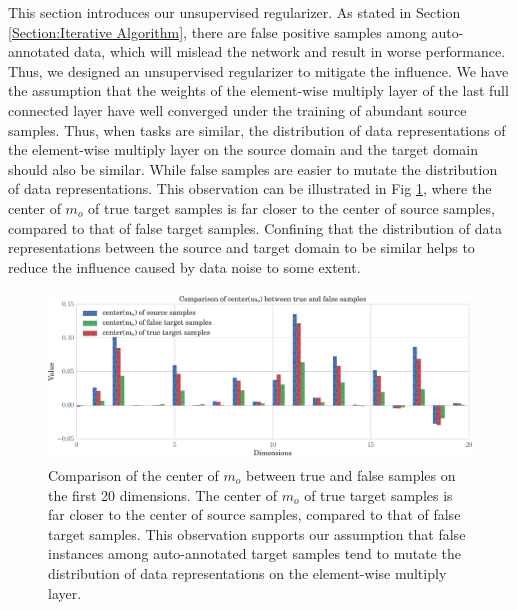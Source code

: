 \documentclass[runningheads]{llncs}
\begin{document}
This section introduces our unsupervised regularizer. As stated in Section \ref{Section:Iterative Algorithm}, there are false positive samples among auto-annotated data, which will mislead the network and result in worse performance. Thus, we designed an unsupervised regularizer to mitigate the influence. We have the assumption that the weights of the element-wise multiply layer of the last full connected layer have well converged under the training of abundant source samples. Thus, when tasks are similar, the distribution of data representations of the element-wise multiply layer on the source domain and the target domain should also be similar. While false samples are easier to mutate the distribution of data representations. This observation can be illustrated in Fig \ref{fig:mmd}, where the center of $m_{o}$ of true target samples is far closer to the center of source samples, compared to that of false target samples. Confining that the distribution of data representations between the source and target domain to be similar helps to reduce the influence caused by data noise to some extent.

\begin{figure}
\centering
\includegraphics[height=4.5cm]{images/mmd.pdf}
\caption{Comparison of the center of $m_{o}$ between true and false samples on the first 20 dimensions. The center of $m_{o}$ of true target samples is far closer to the center of source samples, compared to that of false target samples. This observation supports our assumption that false instances among auto-annotated target samples tend to mutate the distribution of data representations on the element-wise multiply layer.}
\label{fig:mmd}
\end{figure}
\end{document}

